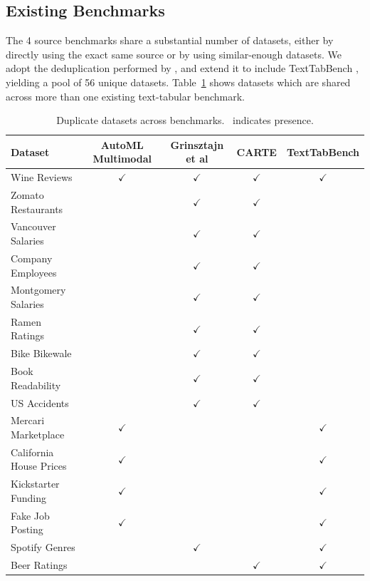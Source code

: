 \subsection{Existing Benchmarks}

The 4 source benchmarks share a substantial number of datasets, either by directly using the exact same source or by using similar-enough datasets. We adopt the deduplication performed by \citet{arazi_tabstar_2025}, and extend it to include TextTabBench \cite{mraz_towards_2025}, yielding a pool of 56 unique datasets. Table~\ref{tab:text_deduplication} shows datasets which are shared across more than one existing text-tabular benchmark.


\begin{table}[ht]
\centering
\caption{Duplicate datasets across benchmarks. \checkmark\ indicates presence.}
\label{tab:text_deduplication}
\small
\begin{tabular}{lcccc}
\toprule
\textbf{Dataset} & \textbf{AutoML Multimodal} & \textbf{Grinsztajn et al} & \textbf{CARTE} & \textbf{TextTabBench} \\
\midrule
Wine Reviews           & $\checkmark$ & $\checkmark$ & $\checkmark$ & $\checkmark$ \\
Zomato Restaurants     &              & $\checkmark$ & $\checkmark$ &              \\
Vancouver Salaries     &              & $\checkmark$ & $\checkmark$ &              \\
Company Employees      &              & $\checkmark$ & $\checkmark$ &              \\
Montgomery Salaries    &              & $\checkmark$ & $\checkmark$ &              \\
Ramen Ratings          &              & $\checkmark$ & $\checkmark$ &              \\
Bike Bikewale          &              & $\checkmark$ & $\checkmark$ &              \\
Book Readability       &              & $\checkmark$ & $\checkmark$ &              \\
US Accidents           &              & $\checkmark$ & $\checkmark$ &              \\
Mercari Marketplace    & $\checkmark$ &              &              & $\checkmark$ \\
California House Prices & $\checkmark$ &              &              & $\checkmark$ \\
Kickstarter Funding    & $\checkmark$ &              &              & $\checkmark$ \\
Fake Job Posting       & $\checkmark$ &              &              & $\checkmark$ \\
Spotify Genres         &              & $\checkmark$ &              & $\checkmark$ \\
Beer Ratings           &              &              & $\checkmark$ & $\checkmark$ \\
\bottomrule
\end{tabular}
\end{table}

